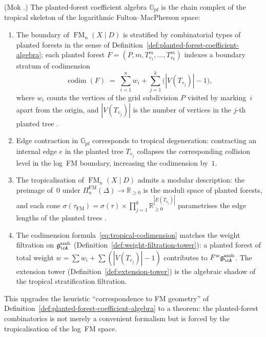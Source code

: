 \begin{proposition}
\label{prop:planted-forest-tropical}
\textup{(Mok \cite[Theorem~3.3.1(2), Definition~3.1.5]{Mok25}.)}
The planted-forest coefficient algebra $\mathbb{G}_{\mathrm{pf}}$
is the chain complex of the tropical skeleton of the logarithmic
Fulton--MacPherson space:
\begin{enumerate}[label=\textup{(\roman*)}]
\item The boundary of\/ $\operatorname{FM}_n(X \mathbin{|} D)$ is
  stratified by combinatorial types of planted forests in the sense
  of Definition~\textup{\ref{def:planted-forest-coefficient-algebra}};
  each planted forest $F = (P, m, T^m_{v_1}, \ldots, T^m_{v_k})$
  indexes a boundary stratum of codimension
  \begin{equation}\label{eq:tropical-codimension}
  \operatorname{codim}(F)
  \;=\;
  \sum_{i=1}^{n} w_i
  + \sum_{j=1}^{k} \bigl(|V(T_{v_j})| - 1\bigr),
  \end{equation}
  where $w_i$ counts the vertices of the grid subdivision $P$
  visited by marking~$i$ apart from the origin, and
  $|V(T_{v_j})|$ is the number of vertices in the $j$-th planted
  tree \cite[Proposition~3.3.2]{Mok25}.
\item Edge contraction in $\mathbb{G}_{\mathrm{pf}}$ corresponds to
  tropical degeneration: contracting an internal edge $e$ in the
  planted tree $T_{v_j}$ collapses the corresponding collision
  level in the log~FM boundary, increasing the codimension by~$1$.
\item The tropicalisation of $\operatorname{FM}_n(X \mathbin{|} D)$
  admits a modular description: the preimage of~$0$ under
  $\Pi_n^{\mathrm{FM}}(\Delta) \to \mathbb{R}_{\geq 0}$ is the
  moduli space of planted forests, and each cone
  $\sigma(\tau_{\mathrm{FM}}) = \sigma(\tau) \times
  \prod_{j=1}^k \mathbb{R}_{\geq 0}^{|E(T_{v_j})|}$
  parametrises the edge lengths of the planted trees
  \cite[Observation~5.2.5]{Mok25}.
\item The codimension formula~\eqref{eq:tropical-codimension}
  matches the weight filtration on
  $\mathfrak{g}^{\mathrm{amb}}_{\cA}$
  \textup{(}Definition~\textup{\ref{def:weight-filtration-tower})}:
  a planted forest of total weight $w = \sum w_i + \sum(|V(T_{v_j})|-1)$
  contributes to $F^w\mathfrak{g}^{\mathrm{amb}}_{\cA}$.
  The extension tower
  \textup{(}Definition~\textup{\ref{def:extension-tower})} is the
  algebraic shadow of the tropical stratification filtration.
\end{enumerate}
This upgrades the heuristic ``correspondence to FM geometry'' of
Definition~\textup{\ref{def:planted-forest-coefficient-algebra}} to a
theorem: the planted-forest combinatorics is not merely a convenient
formalism but is forced by the tropicalisation of the log~FM
space.
\end{proposition}

